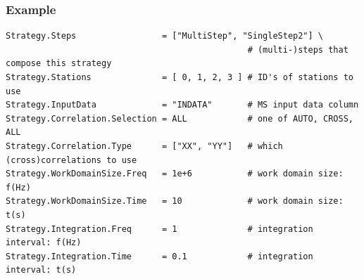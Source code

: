 \documentclass[10pt]{lofar}
\begin{document}
\subsubsection*{Example}
{\footnotesize
\begin{verbatim}
Strategy.Steps                 = ["MultiStep", "SingleStep2"] \
                                                # (multi-)steps that compose this strategy
Strategy.Stations              = [ 0, 1, 2, 3 ] # ID's of stations to use
Strategy.InputData             = "INDATA"       # MS input data column
Strategy.Correlation.Selection = ALL            # one of AUTO, CROSS, ALL
Strategy.Correlation.Type      = ["XX", "YY"]   # which (cross)correlations to use
Strategy.WorkDomainSize.Freq   = 1e+6           # work domain size: f(Hz)
Strategy.WorkDomainSize.Time   = 10             # work domain size: t(s)
Strategy.Integration.Freq      = 1              # integration interval: f(Hz)
Strategy.Integration.Time      = 0.1            # integration interval: t(s)
\end{verbatim}
}
\end{document}
